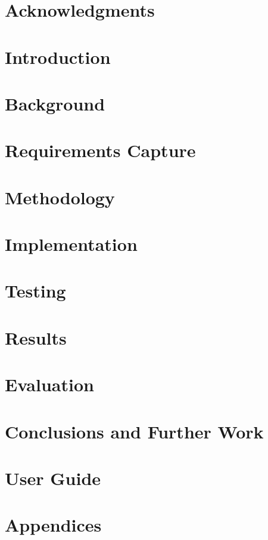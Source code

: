 \documentclass[12pt]{report}
\begin{document}
\tableofcontents
\clearpage


\chapter*{Acknowledgments}


\chapter{Introduction}


\chapter{Background}


\chapter{Requirements Capture}


\chapter{Methodology}


\chapter{Implementation}


\chapter{Testing}


\chapter{Results}


\chapter{Evaluation}


\chapter{Conclusions and Further Work}


\chapter{User Guide}


\printbibliography

\appendix
\chapter{Appendices}

\end{document}
